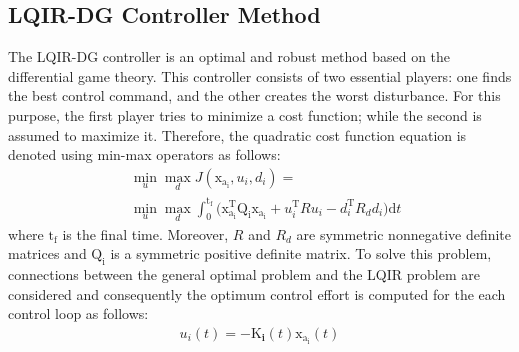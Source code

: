 \documentclass[conference]{IEEEtran}
\begin{document}
\subsection{LQIR-DG Controller Method}
\noindent The LQIR-DG controller is an optimal and robust method based on the differential game theory. This controller consists of two essential players: one finds the best control command, and the other creates the worst disturbance. 
For this purpose, the first player tries to minimize a cost function; while the second is assumed to maximize it. Therefore, the quadratic cost function equation is denoted using min-max operators as follows:
\begin{equation}
	    \begin{split}
		&\min_{u} \max_{d} J(\boldsymbol{\mathrm{x_{a_i}}}, {u_i}, {d_i}) =\\ & \min_{u} \max_{d}
         \int_{0}^{\mathrm{t_f}}\biggl (\boldsymbol{\mathrm{x^\mathrm{T}_{a_i}}}  \boldsymbol{\mathrm{Q_i}} \boldsymbol{\mathrm{x_{a_i}}}+
        {{u^\mathrm{T}_i}}  {{R}} {{u_i}}-
        {{d^\mathrm{T}_{i}}} {{ R_{d} d_{i}}}
        \biggl )\mathrm{d}t
    \end{split}
\end{equation}
where $\mathrm{t_f}$ is the final time. Moreover, ${{ R}}$ and ${{R_{d}}}$ are symmetric nonnegative definite matrices and $\boldsymbol{\mathrm{Q_i}} $ is a symmetric positive definite matrix. To solve this problem, connections between the general optimal problem and the LQIR problem are considered \cite{LQDG} and consequently the optimum control effort is computed for the each control loop as follows:
\begin{equation}
	\begin{split}
		{{u_i}}(t) = -\boldsymbol{{\mathrm{K}}_{i}}(t) \boldsymbol{{\mathrm{x_{a_i}}}}(t)
	\end{split}
\end{equation}
\end{document}
